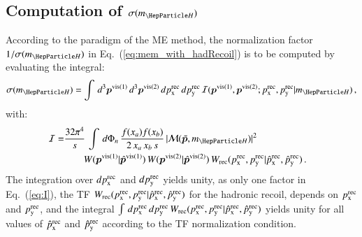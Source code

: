 \subsection{Computation of $\sigma(m_{\PHiggs})$}
\label{sec:mem_xSection}

According to the paradigm of the ME method, the normalization factor
$1/\sigma(m_{\PHiggs})$ in Eq.~(\ref{eq:mem_with_hadRecoil}) is to be computed
by evaluating the integral:
\begin{equation}
\sigma(m_{\PHiggs}) =
\int \, d^{3}\bm{p}^{\vis(1)} \, d^{3}\bm{p}^{\vis(2)} \,
d\pX^{\rec} \, d\pY^{\rec} \, \mathcal{I}(\bm{p}^{\vis(1)},\bm{p}^{\vis(2)};\pX^{\rec},\pY^{\rec}|m_{\PHiggs}) \, ,
\label{eq:xSection}
\end{equation}
with:
\begin{align}
\mathcal{I} = & \frac{32\pi^{4}}{s} \, \int \, d\Phi_{n} \,
\frac{f(x_{a}) f(x_{b})}{2 \, x_{a} \, x_{b} \, s} \, \vert \mathcal{M}(\tilde{\bm{p}},m_{\PHiggs}) \vert^{2} \, \hspace{2cm} \nonumber \\
& \qquad W(\bm{p}^{\vis(1)}|\hat{\bm{p}}^{\vis(1)}) \, W(\bm{p}^{\vis(2)}|\hat{\bm{p}}^{\vis(2)}) \, W_{\rec}( \pX^{\rec},\pY^{\rec} | \pXhat^{\rec},\pYhat^{\rec} ) \, .
\label{eq:I}
\end{align}
The integration over $dp_{\textrm{x}}^{\textrm{rec}}$ and $dp_{\textrm{y}}^{\textrm{rec}}$ yields unity,
as only one factor in Eq.~(\ref{eq:I}), the TF $W_{\textrm{rec}}( p_{\textrm{x}}^{\textrm{rec}},p_{\textrm{y}}^{\textrm{rec}} | \hat{p}_{\textrm{x}}^{\textrm{rec}},\hat{p}_{\textrm{y}}^{\textrm{rec}} )$ for the hadronic recoil,
depends on $p_{\textrm{x}}^{\textrm{rec}}$ and $p_{\textrm{y}}^{\textrm{rec}}$,
and the integral $\int \, dp_{\textrm{x}}^{\textrm{rec}} \, dp_{\textrm{y}}^{\textrm{rec}} \, W_{\textrm{rec}}(
p_{\textrm{x}}^{\textrm{rec}}, p_{\textrm{y}}^{\textrm{rec}} | \hat{p}_{\textrm{x}}^{\textrm{rec}}, \hat{p}_{\textrm{y}}^{\textrm{rec}} )$ yields unity for all values of $\hat{p}_{\textrm{x}}^{\textrm{rec}}$ and $\hat{p}_{\textrm{y}}^{\textrm{rec}}$
according to the TF normalization condition.

